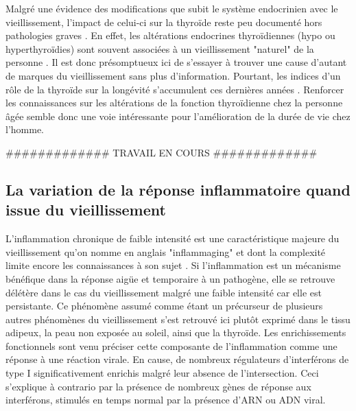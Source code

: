 Malgré une évidence des modifications que subit le système endocrinien avec le vieillissement, l'impact de celui-ci sur la thyroïde reste peu documenté hors pathologies graves \cite{Faggiano2011Sep}. En effet, les altérations endocrines thyroïdiennes (hypo ou hyperthyroïdies) sont souvent associées à un vieillissement "naturel" de la personne \cite{Cooper2004Dec}. Il est donc présomptueux ici de s'essayer à trouver une cause d'autant de marques du vieillissement sans plus d'information. Pourtant, les indices d'un rôle de la thyroïde sur la longévité s'accumulent ces dernières années \cite{Garasto2017Jul,Arosio2020Sep}. Renforcer les connaissances sur les altérations de la fonction thyroïdienne chez la personne âgée semble donc une voie intéressante pour l'amélioration de la durée de vie chez l'homme.

\#\#\#\#\#\#\#\#\#\#\#\#\# TRAVAIL EN COURS \#\#\#\#\#\#\#\#\#\#\#\#\#

\subsection{La variation de la réponse inflammatoire quand issue du vieillissement}

L'inflammation chronique de faible intensité est une caractéristique majeure du vieillissement qu'on nomme en anglais "inflammaging" \cite{Franceschi2014Jun} et dont la complexité limite encore les connaissances à son sujet \cite{Franceschi2017}. Si l'inflammation est un mécanisme bénéfique dans la réponse aigüe et temporaire à un pathogène, elle se retrouve délétère dans le cas du vieillissement malgré une faible intensité car elle est persistante. Ce phénomène assumé comme étant un précurseur de plusieurs autres phénomènes du vieillissement \cite{Lopez-Otin2013} s'est retrouvé ici plutôt exprimé dans le tissu adipeux, la peau non exposée au soleil, ainsi que la thyroïde. Les enrichissements fonctionnels sont venu préciser cette composante de l'inflammation comme une réponse à une réaction virale. En cause, de nombreux régulateurs d'interférons de type I significativement enrichis malgré leur absence de l'intersection. Ceci s'explique à contrario par la présence de nombreux gènes de réponse aux interférons, stimulés en temps normal par la présence d'ARN ou ADN viral.

